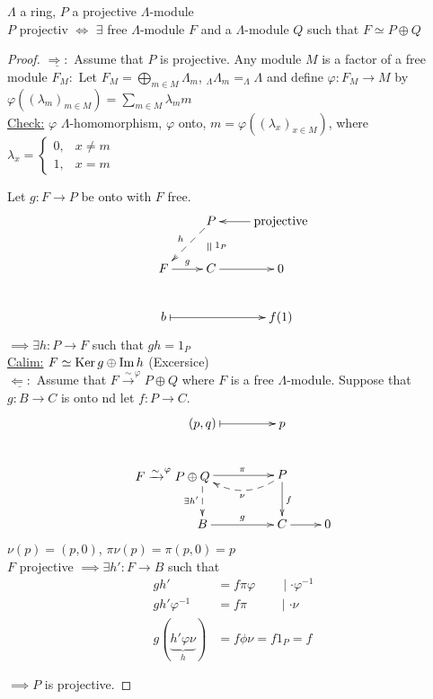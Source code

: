 \begin{prop}
$\Lambda$ a ring, $P$ a projective $\Lambda$-module\\
$P$ projectiv $\iff$ $\exists$ free $\Lambda$-module $F$ and a $\Lambda$-module $Q$ such that $F \simeq P \oplus Q$
\begin{proof}
$\underline{\Rightarrow :}$ Assume that $P$ is projective. Any module $M$ is a factor of a free module $F_M : $ Let $F_M = \bigoplus_{m \in M} \Lambda_m$, $_\Lambda\Lambda_m = _\Lambda\Lambda$ and define $\varphi: F_M \to M$ by $\varphi((\lambda_m)_{m \in M}) = \sum_{m \in M} \lambda_m m$\\
\underline{Check:} $\varphi$ $\Lambda$-homomorphism, $\varphi$ onto, $m = \varphi((\lambda_x)_{x \in M})$, where $\lambda_x = \begin{cases}
0, & x \neq m\\
1, & x = m
\end{cases}$ 

Let $g: F \to P$ be onto with $F$ free.
$$\xymatrix{
& P\ar@{-->}[ld]_h \ar@{}[d]^{1_P}|-*[@]{=} & \text{projective} \ar[l]\\
F \ar[r]^g & C \ar[r] & 0\\
b\ar@{|->}[rr] && f(1)
}$$
$\implies \exists h: P \to F$ such that $gh = 1_P$\\

\underline{Calim:} $F \simeq \operatorname{Ker}\nolimits g \oplus \operatorname{Im}\nolimits h$ (Excersice)\\

$\underline{\Leftarrow :}$ Assume that $F \xrightarrow{\sim}^\varphi P \oplus Q$ where $F$ is a free $\Lambda$-module. Suppose that $g: B \to C$ is onto nd let $f: P \to C$.
$$
\xymatrix{
(p, q)\ar@{|->}[r] & p\\
*+[l]{F \xrightarrow{\sim}^\varphi P \oplus Q} \ar[r]^\pi \ar@{-->}[d]_{\exists h'} & P \ar@/^1pc/@{-->}[l]^\nu \ar[d]^f\\
B \ar[r]^g & C \ar[r] & 0
}
$$
$\nu(p) = (p, 0)$, $\pi\nu(p) = \pi(p,0) = p$\\
$F$ projective $\implies \exists h': F \to B$ such that 
\begin{equation*}
\begin{split}
gh' &= f\pi \varphi \;\;\;\;\;\;\; \mid \cdot \varphi^{-1}\\
gh'\varphi^{-1} &= f\pi \;\;\;\;\;\;\;\;\; \mid \cdot \nu\\
g(\underbrace{h'\varphi \nu}_h) &= f\phi\nu = f 1_P = f
\end{split}
\end{equation*}

$\implies P$ is projective.
\end{proof}
\end{prop}

